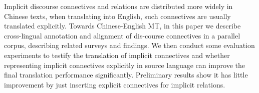 Implicit discourse connectives and relations are distributed more widely in Chinese texts, when translating into English, such connectives are usually translated explicitly. Towards Chinese-English MT, in this paper we describe cross-lingual annotation and alignment of dis-course connectives in a parallel corpus, describing related surveys and findings. We then conduct some evaluation experiments to testify the translation of implicit connectives and whether representing implicit connectives explicitly in source language can improve the final translation performance significantly. Preliminary results show it has little improvement by just inserting explicit connectives for implicit relations.
